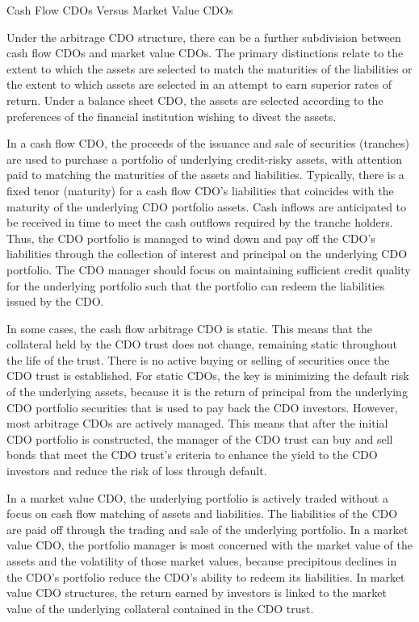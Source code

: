 \documentclass[11pt]{article}
\begin{document}
Cash Flow CDOs Versus Market Value CDOs

Under the arbitrage CDO structure, there can be a further subdivision between cash flow CDOs and market value CDOs. The primary distinctions relate to the extent to which the assets are selected to match the maturities of the liabilities or the extent to which assets are selected in an attempt to earn superior rates of return. Under a balance sheet CDO, the assets are selected according to the preferences of the financial institution wishing to divest the assets.

In a cash flow CDO, the proceeds of the issuance and sale of securities (tranches) are used to purchase a portfolio of underlying credit-risky assets, with attention paid to matching the maturities of the assets and liabilities. Typically, there is a fixed tenor (maturity) for a cash flow CDO's liabilities that coincides with the maturity of the underlying CDO portfolio assets. Cash inflows are anticipated to be received in time to meet the cash outflows required by the tranche holders. Thus, the CDO portfolio is managed to wind down and pay off the CDO's liabilities through the collection of interest and principal on the underlying CDO portfolio. The CDO manager should focus on maintaining sufficient credit quality for the underlying portfolio such that the portfolio can redeem the liabilities issued by the CDO.

In some cases, the cash flow arbitrage CDO is static. This means that the collateral held by the CDO trust does not change, remaining static throughout the life of the trust. There is no active buying or selling of securities once the CDO trust is established. For static CDOs, the key is minimizing the default risk of the underlying assets, because it is the return of principal from the underlying CDO portfolio securities that is used to pay back the CDO investors. However, most arbitrage CDOs are actively managed. This means that after the initial CDO portfolio is constructed, the manager of the CDO trust can buy and sell bonds that meet the CDO trust's criteria to enhance the yield to the CDO investors and reduce the risk of loss through default.

In a market value CDO, the underlying portfolio is actively traded without a focus on cash flow matching of assets and liabilities. The liabilities of the CDO are paid off through the trading and sale of the underlying portfolio. In a market value CDO, the portfolio manager is most concerned with the market value of the assets and the volatility of those market values, because precipitous declines in the CDO's portfolio reduce the CDO's ability to redeem its liabilities. In market value CDO structures, the return earned by investors is linked to the market value of the underlying collateral contained in the CDO trust.
\end{document}

